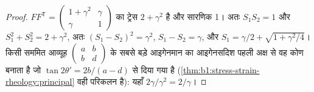 \begin{proof}
$FF^{\mathsf T} = \begin{pmatrix} 1+\gamma^2 & \gamma \\ \gamma & 1\end{pmatrix}$ का ट्रेस $2+\gamma^2$ है और सारणिक 1। अतः $S_1S_2 = 1$ और $S_1^2 + S_2^2 = 2 + \gamma^2$, अतः $(S_1 - S_2)^2 = \gamma^2$, $S_1 - S_2 = \gamma$, और $S_1 = \gamma/2 + \sqrt{1+\gamma^2/4}$। किसी सममित आव्यूह $\begin{pmatrix} a & b \\ b & d\end{pmatrix}$ के सबसे बड़े आइगेनमान का आइगेनसदिश पहली अक्ष से वह कोण बनाता है जो $\tan2\theta' = 2b/(a-d)$ से दिया गया है (\cref{thm:b1:stress-strain-rheology:principal} वही परिकलन है): यहाँ $2\gamma/\gamma^2 = 2/\gamma$।
\end{proof}


